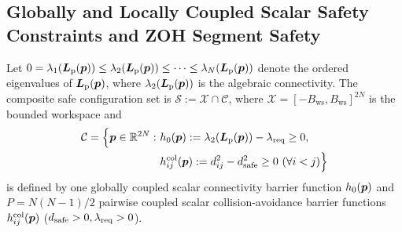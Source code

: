 \subsection{Globally and Locally Coupled Scalar Safety Constraints and ZOH Segment Safety}
Let $0=\lambda_1(\boldsymbol{L}_{\mathrm{p}}(\boldsymbol{p}))\le\lambda_2(\boldsymbol{L}_{\mathrm{p}}(\boldsymbol{p}))\le\cdots\le\lambda_N(\boldsymbol{L}_{\mathrm{p}}(\boldsymbol{p}))$ denote the ordered eigenvalues of $\boldsymbol{L}_{\mathrm{p}}(\boldsymbol{p})$, where $\lambda_2(\boldsymbol{L}_{\mathrm{p}}(\boldsymbol{p}))$ is the algebraic connectivity. The composite safe configuration set is $\mathcal S:=\mathcal X\cap\mathcal C$, where $\mathcal X=[-B_{\mathrm{ws}},B_{\mathrm{ws}}]^{2N}$ is the bounded workspace and
\begin{equation}
\begin{split}
 \mathcal C=\Big\{\bp\in\mathbb R^{2N}:\ &h_0(\bp):=\lambda_2(\bL(\bp))-\lr\ge 0,\\
 &h_{ij}^{\mathrm{col}}(\bp):=d_{ij}^2-\ds^2\ge 0\ (\forall i<j)\Big\}
\end{split}
 \label{eq:safe-set}
\end{equation}
is defined by one globally coupled scalar connectivity barrier function $h_0(\boldsymbol{p})$ and $P=N(N-1)/2$ pairwise coupled scalar collision-avoidance barrier functions $h_{ij}^{\mathrm{col}}(\boldsymbol{p})$ ($d_{\mathrm{safe}}>0,\lambda_{\mathrm{req}}>0$).

